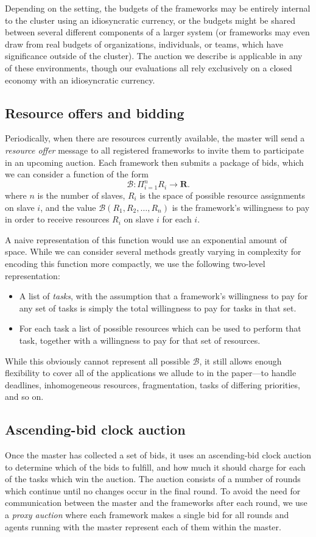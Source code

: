 \documentclass{acm_proc_article-sp}
\begin{document}
Depending on the setting, the budgets of the frameworks may be entirely internal to the cluster
using an idiosyncratic currency,
or the budgets might be shared between several different components of a larger system
(or frameworks may even draw from real budgets of organizations, individuals, or teams,
which have significance outside of the cluster).
The auction we describe is applicable in any of these environments,
though our evaluations all rely exclusively on a closed economy with an idiosyncratic currency.

\subsection{Resource offers and bidding}
Periodically, when there are resources currently available, the master will
send a \emph{resource offer} message to all registered frameworks to invite them
to participate in an upcoming auction. Each framework then submits a package of
bids, which we can consider a function of the form
\[ \mathcal{B}: \Pi_{i=1}^n R_i \rightarrow \mathbf{R}. \]
where $n$ is the number of slaves, 
$R_i$ is the space of possible resource assignments on slave $i$,
and the value $\mathcal{B}\left(R_1, R_2, \ldots, R_n\right)$ is the framework's
willingness to pay in order to receive resources $R_i$ on slave $i$ for each $i$.

A naive representation of this function would use an exponential amount of
space. While we can consider several methods greatly varying in
complexity for encoding this function more compactly, we use the following
two-level representation:
\begin{itemize}
  \item A list of \emph{tasks}, with the assumption that a framework's
    willingness to pay for any set of tasks is simply the total
    willingness to pay for tasks in that set.
  \item For each task a list of possible resources which can be used to perform
    that task, together with a willingness to pay for that set of resources.
\end{itemize}
While this obviously cannot represent all possible $\mathcal{B}$, it still
allows enough flexibility to cover all of the applications we allude to
in the paper---to handle deadlines, inhomogeneous resources, fragmentation,
tasks of differing priorities, and so on.

\subsection{Ascending-bid clock auction}
Once the master has collected a set of bids, it uses an ascending-bid clock
auction to determine which of the bids to fulfill, and how much it should charge
for each of the tasks which win the auction. The auction consists of a number of
rounds which continue until no changes occur in the final round. To avoid the
need for communication between the master and the frameworks after each round,
we use a \emph{proxy auction} where each framework makes a single bid for all
rounds and agents running with the master represent each of them within the
master.
\end{document}

